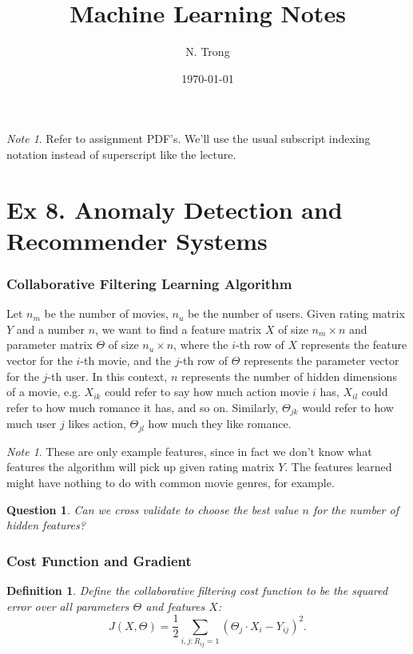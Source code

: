 \documentclass[12pt]{article}
\title{Machine Learning Notes}
\author{N. Trong}
\date{\today}                                           %
\theoremstyle{plain}
\newtheorem{quest}[thm]{Question}
\newtheorem{defn}[thm]{Definition}
\theoremstyle{definition}
\theoremstyle{remark}
\newtheorem{note}[thm]{Note}
\begin{document}
\maketitle

\begin{note}
Refer to assignment PDF's. We'll use the usual subscript indexing notation instead of superscript like the lecture.
\end{note}

\part{Ex 8. Anomaly Detection and Recommender Systems}

\section{Collaborative Filtering Learning Algorithm}

Let $n_m$ be the number of movies, $n_u$ be the number of users. Given rating matrix $Y$ and a number $n$, we want to find a feature matrix $X$ of size $n_m \times n$ and parameter matrix $\Theta$ of size $n_u \times n$, where the $i$-th row of $X$ represents the feature vector for the $i$-th movie, and the $j$-th row of $\Theta$ represents the parameter vector for the $j$-th user. In this context, $n$ represents the number of hidden dimensions of a movie, e.g. $X_{ik}$ could refer to say how much action movie $i$ has, $X_{il}$ could refer to how much romance it has, and so on. Similarly, $\Theta_{jk}$ would refer to how much user $j$ likes action, $\Theta_{jl}$ how much they like romance.

\begin{note}
These are only example features, since in fact we don't know what features the algorithm will pick up given rating matrix $Y$. The features learned might have nothing to do with common movie genres, for example.
\end{note}

\begin{quest}
Can we cross validate to choose the best value $n$ for the number of hidden features?
\end{quest}

\section{Cost Function and Gradient}

\begin{defn}
Define the collaborative filtering cost function to be the squared error over all parameters $\Theta$ and features $X$:
$$J(X, \Theta) = \frac{1}{2} \sum_{i,j:R_{ij}=1} (\Theta_j \cdot X_i - Y_{ij})^2.$$ 
\end{defn}
\end{document}
